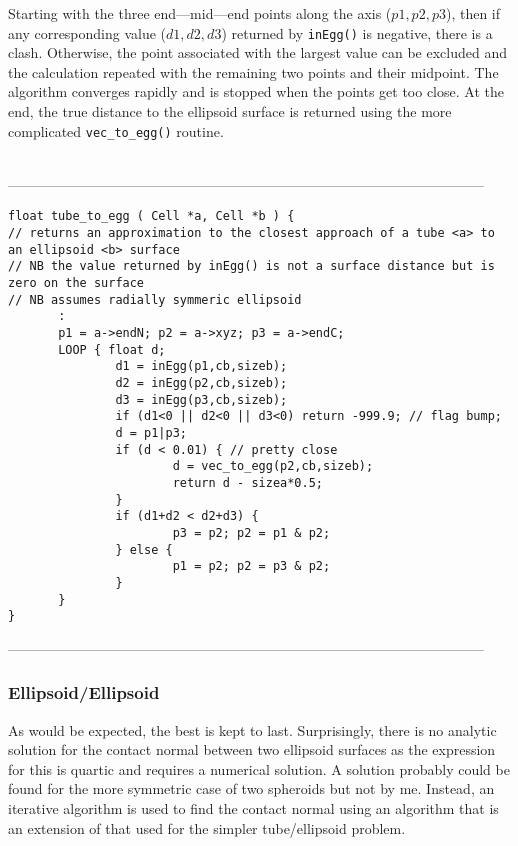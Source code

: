 {{{{{Starting with the three end---mid---end points along the axis ($p1,p2,p3$), then if any corresponding
value ($d1,d2,d3$) returned by {\tt inEgg()} is negative, there is a clash.   Otherwise, the point
associated with the largest value can be excluded and the calculation repeated with the remaining
two points and their midpoint.   The algorithm converges rapidly and is stopped when the points
get too close.   At the end, the true distance to the ellipsoid surface is returned using the
more complicated {\tt vec\_to\_egg()} routine.
\begin{singlespace}
\ \\
------------------------------------------------------------------------------------------------------
\begin{tiny}
\begin{verbatim}
float tube_to_egg ( Cell *a, Cell *b ) {
// returns an approximation to the closest approach of a tube <a> to an ellipsoid <b> surface
// NB the value returned by inEgg() is not a surface distance but is zero on the surface
// NB assumes radially symmeric ellipsoid
       :
       p1 = a->endN; p2 = a->xyz; p3 = a->endC;
       LOOP { float d;
               d1 = inEgg(p1,cb,sizeb);
               d2 = inEgg(p2,cb,sizeb);
               d3 = inEgg(p3,cb,sizeb);
               if (d1<0 || d2<0 || d3<0) return -999.9; // flag bump;
               d = p1|p3;
               if (d < 0.01) { // pretty close
                       d = vec_to_egg(p2,cb,sizeb);
                       return d - sizea*0.5;
               }
               if (d1+d2 < d2+d3) {
                       p3 = p2; p2 = p1 & p2;
               } else {
                       p1 = p2; p2 = p3 & p2;
               }
       }
}
\end{verbatim}
\end{tiny}
------------------------------------------------------------------------------------------------------
\end{singlespace}

\subsubsection{Ellipsoid/Ellipsoid}

As would be expected, the best is kept to last.
Surprisingly, there is no analytic solution for the contact normal between two ellipsoid
surfaces as the expression for this is quartic and requires a numerical solution.
A solution probably could be found for the more symmetric case of two spheroids but not
by me.   Instead, an iterative algorithm is used to find the contact normal using an
algorithm that is an extension of that used for the simpler tube/ellipsoid problem. 

}}}}}
